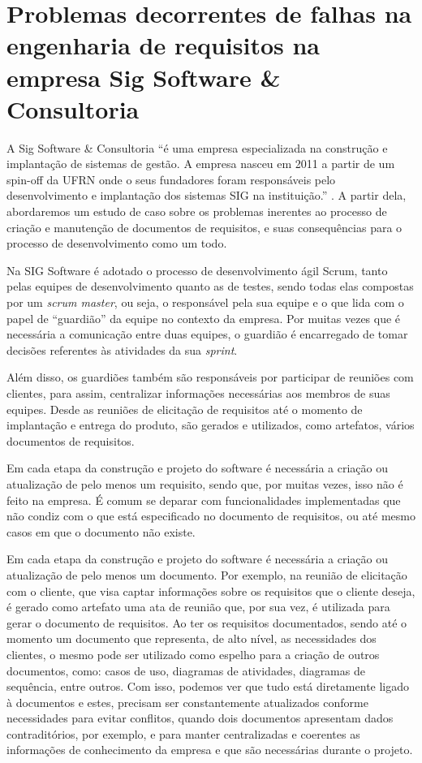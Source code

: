 \documentclass[12pt]{article}
\begin{document}
\section{Problemas decorrentes de falhas na engenharia de requisitos na empresa 
Sig Software & Consultoria}

A Sig Software & Consultoria “é uma empresa especializada na construção e implantação de 
sistemas de gestão. A empresa nasceu em 2011 a partir de um spin-off da UFRN onde o seus 
fundadores foram responsáveis pelo desenvolvimento e implantação dos sistemas SIG na 
instituição.” \cite{esig:2014}. A partir dela, abordaremos um estudo de caso sobre os problemas 
inerentes ao processo de criação e manutenção de documentos de requisitos, e suas 
consequências para o processo de desenvolvimento como um todo.

Na SIG Software é adotado o processo de desenvolvimento ágil Scrum, tanto pelas equipes 
de desenvolvimento quanto as de testes, sendo todas elas compostas por um \textit{scrum master}, 
ou seja, o responsável pela sua equipe e o que lida com o papel de “guardião” da equipe 
no contexto da empresa. Por muitas vezes que é necessária a comunicação entre duas 
equipes, o guardião é encarregado de tomar decisões referentes às atividades da sua 
\textit{sprint}.

Além disso, os guardiões também são responsáveis por participar de reuniões com clientes, 
para assim, centralizar informações necessárias aos membros de suas equipes. Desde as 
reuniões de elicitação de requisitos até o momento de implantação e entrega do produto, 
são gerados e utilizados, como artefatos, vários documentos de requisitos.

Em cada etapa da construção e projeto do software é necessária a criação ou atualização 
de pelo menos um requisito, sendo que, por muitas vezes, isso não é feito na empresa. 
É comum se deparar com funcionalidades implementadas que não condiz com o que está 
especificado no documento de requisitos, ou até mesmo casos em que o documento 
não existe.

Em cada etapa da construção e projeto do software é necessária a criação ou atualização 
de pelo menos um documento. Por exemplo, na reunião de elicitação com o cliente, que visa 
captar informações sobre os requisitos que o cliente deseja, é gerado como artefato uma ata 
de reunião que, por sua vez, é utilizada para gerar o documento de requisitos. Ao ter os 
requisitos documentados, sendo até o momento um documento que representa, de alto nível, 
as necessidades dos clientes, o mesmo pode ser utilizado como espelho para a criação de 
outros documentos, como: casos de uso, diagramas de atividades, diagramas de sequência, 
entre outros. Com isso, podemos ver que tudo está diretamente ligado à documentos e 
estes, precisam ser constantemente atualizados conforme necessidades para evitar 
conflitos, quando dois documentos apresentam dados contraditórios, por exemplo, e para 
manter centralizadas e coerentes as informações de conhecimento da empresa e que são 
necessárias durante o projeto.
\end{document}
